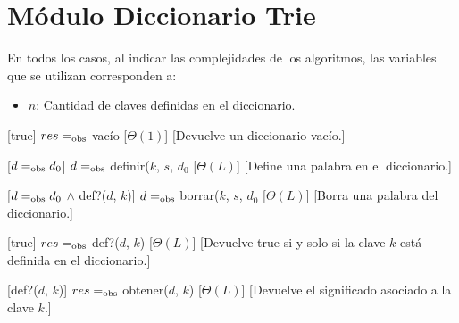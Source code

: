 \section{M\'{o}dulo Diccionario Trie}

  En todos los casos, al indicar las complejidades de los algoritmos, las variables que se utilizan corresponden a:
  \vspace{-0.5em}\begin{itemize}
    \item $n$: Cantidad de claves definidas en el diccionario.
  \end{itemize}

\begin{Interfaz}
  
  \begin{paramFormales}
    \paramGeneros{$\alpha$}

    

  \end{paramFormales}




    [true]
    {$res =_{\mathrm{obs}}$ vac\'{i}o}
    [$\Theta(1)$]
    [Devuelve un diccionario vac\'io.]

    [$d =_{\mathrm{obs}} d_{0}$]
    {$d =_{\mathrm{obs}}$ definir($k$, $s$, $d_{0}$}
    [$\Theta(L)$]
    [Define una palabra en el diccionario.]

    [$d =_{\mathrm{obs}} d_{0}$ $\land$ def?($d$, $k$)]
    {$d =_{\mathrm{obs}}$ borrar($k$, $s$, $d_{0}$}
    [$\Theta(L)$]
    [Borra una palabra del diccionario.]

    [true]
    {$res =_{\mathrm{obs}}$ def?($d$, $k$)}
    [$\Theta(L)$]
    [Devuelve true si y solo si la clave $k$ est\'a definida en el diccionario.]

    [def?($d$, $k$)]
    {$res =_{\mathrm{obs}}$ obtener($d$, $k$)}
    [$\Theta(L)$]
    [Devuelve el significado asociado a la clave $k$.]

\end{Interfaz}
